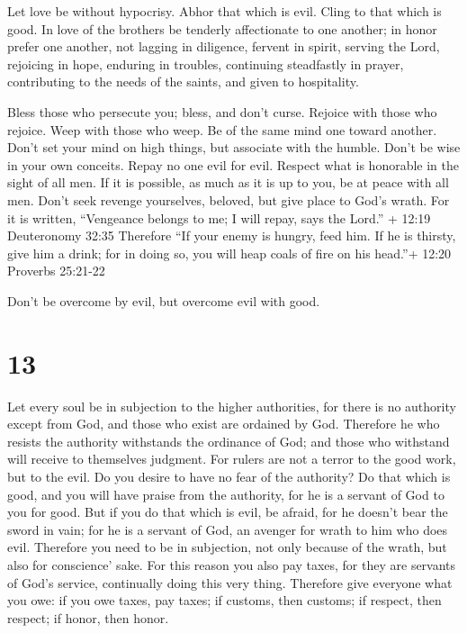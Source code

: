  Let love be without hypocrisy. Abhor that which is evil.
Cling to that which is good.  In love of the brothers be
tenderly affectionate to one another; in honor prefer one another,
 not lagging in diligence, fervent in spirit, serving the
Lord,  rejoicing in hope, enduring in troubles, continuing
steadfastly in prayer,  contributing to the needs of the
saints, and given to hospitality.

 Bless those who persecute you; bless, and don't curse.
 Rejoice with those who rejoice. Weep with those who weep.
 Be of the same mind one toward another. Don't set your
mind on high things, but associate with the humble. Don't be wise in
your own conceits.  Repay no one evil for evil. Respect
what is honorable in the sight of all men.  If it is
possible, as much as it is up to you, be at peace with all men.
 Don't seek revenge yourselves, beloved, but give place to
God's wrath. For it is written, ``Vengeance belongs to me; I will repay,
says the Lord.'' + 12:19 Deuteronomy 32:35  Therefore ``If
your enemy is hungry, feed him. If he is thirsty, give him a drink; for
in doing so, you will heap coals of fire on his head.''+ 12:20 Proverbs
25:21-22

 Don't be overcome by evil, but overcome evil with good.

\hypertarget{section-12}{%
\section{13}\label{section-12}}

 Let every soul be in subjection to the higher authorities,
for there is no authority except from God, and those who exist are
ordained by God.  Therefore he who resists the authority
withstands the ordinance of God; and those who withstand will receive to
themselves judgment.  For rulers are not a terror to the
good work, but to the evil. Do you desire to have no fear of the
authority? Do that which is good, and you will have praise from the
authority,  for he is a servant of God to you for good. But
if you do that which is evil, be afraid, for he doesn't bear the sword
in vain; for he is a servant of God, an avenger for wrath to him who
does evil.  Therefore you need to be in subjection, not only
because of the wrath, but also for conscience' sake.  For
this reason you also pay taxes, for they are servants of God's service,
continually doing this very thing.  Therefore give everyone
what you owe: if you owe taxes, pay taxes; if customs, then customs; if
respect, then respect; if honor, then honor.


